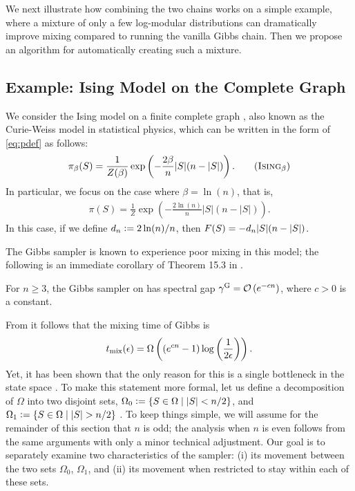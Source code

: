 We next illustrate how combining the two chains works on a simple example, where a mixture of only a few log-modular distributions can dramatically improve mixing compared to running the vanilla Gibbs chain.
Then %
we propose an algorithm for automatically creating such a mixture.

\subsection{Example: Ising Model on the Complete Graph} \label{sect:ising}
We consider the Ising model on a finite complete graph \citep{levin08}, also known as the Curie-Weiss model in statistical physics, which can be written in the form of \eqref{eq:pdef} as follows:
\begin{align*}
  \pib(S) = \frac{1}{Z(\beta)}\exp\left(-\frac{2\beta}{n} |S|(n-|S|)\right). \tag{\isingb}
\end{align*}
In particular, we focus on the case where $\beta = \ln(n)$, that is,
\begin{align*}
  \pi(S) = \frac{1}{Z}\exp\left(-\frac{2\ln(n)}{n} |S|(n-|S|)\right). \tag{\ising}
\end{align*}
In this case, if we define $d_n \vcentcolon= 2 \ln(n) / n$, then $F(S) = -d_n |S|(n-|S|)$.

The Gibbs sampler is known to experience poor mixing in this model; the following is an immediate corollary of Theorem 15.3 in \citep{levin08book}.
\begin{cor}
  For $n \geq 3$, the Gibbs sampler on \ising{} has spectral gap $\gamma^{\mathrm{G}} = \mathcal{O}\left(e^{-cn}\right)$, where $c > 0$ is a constant.
\end{cor}
\noindent From  it follows that the mixing time of Gibbs is
\begin{align*}
    t_{\mathrm{mix}}(\epsilon) = \Omega\left((e^{cn} - 1)\log\left(\frac{1}{2\epsilon}\right) \right).
\end{align*}
Yet, it has been shown that the only reason for this is a single bottleneck in the state space \citep{levin08}.
To make this statement more formal, let us define a decomposition of $\Omega$ into two disjoint sets, $\Omega_0 \vcentcolon= \{S \in \Omega \mid |S| < n/2\}$, and $\Omega_1 \vcentcolon= \{S \in \Omega \mid |S| > n/2\}$ \citep{jerrum04poincare}.
To keep things simple, we will assume for the remainder of this section that $n$ is odd; the analysis when $n$ is even follows from the same arguments with only a minor technical adjustment.
Our goal is to separately examine two characteristics of the sampler: (i) its movement between the two sets $\Omega_0$, $\Omega_1$, and (ii) its movement when restricted to stay within each of these sets.

